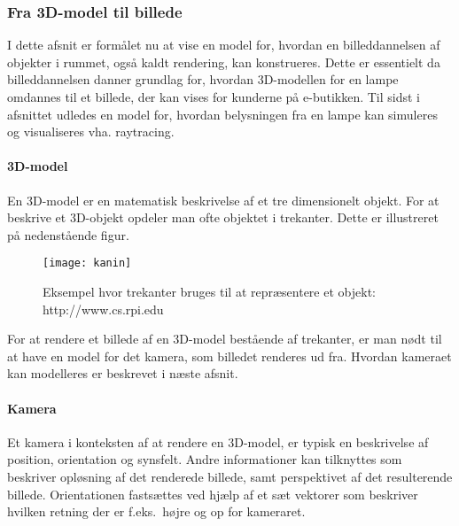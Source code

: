 \subsubsection{Fra 3D-model til billede}
\label{sec:fra_model_til_billede}
I dette afsnit er formålet nu at vise en model for, hvordan en billeddannelsen af objekter i rummet, også kaldt rendering, kan konstrueres. Dette er essentielt da billeddannelsen danner grundlag for, hvordan 3D-modellen for en lampe omdannes til et billede, der kan vises for kunderne på e-butikken. Til sidst i afsnittet udledes en model for, hvordan belysningen fra en lampe kan simuleres og visualiseres vha. raytracing. 

\paragraph{3D-model}
En 3D-model er en matematisk beskrivelse af et tre dimensionelt objekt. For at beskrive et 3D-objekt opdeler man ofte objektet i trekanter. Dette er illustreret på nedenstående figur.

\begin{figure}[H]
\label{fig:kanin}
    \centering
    \texttt{[image: kanin]}
    \caption{Eksempel hvor trekanter bruges til at repræsentere et objekt: http://www.cs.rpi.edu}
\end{figure}

For at rendere et billede af en 3D-model bestående af trekanter, er man nødt til at have en model for det kamera, som billedet renderes ud fra. Hvordan kameraet kan modelleres er beskrevet i næste afsnit.

\paragraph{Kamera}
Et kamera i konteksten af at rendere en 3D-model, er typisk en beskrivelse af position, orientation og synsfelt. Andre informationer kan tilknyttes som beskriver opløsning af det renderede billede, samt perspektivet af det resulterende billede. Orientationen fastsættes ved hjælp af et sæt vektorer som beskriver hvilken retning der er f.eks.\ højre og op for kameraret.

